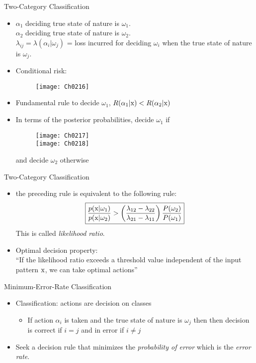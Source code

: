\begin{frame}{Two-Category Classification}
\begin{itemize}
\item $\alpha_1$ deciding true state of nature is $\omega_1$.\\
$\alpha_2$ deciding true state of nature is $\omega_2$.\\
$\lambda_{ij}=\lambda(\alpha_i|\omega_j)$ = loss incurred for deciding $\omega_i$ when the true state of nature is $\omega_j$.
\item Conditional risk:
\begin{figure}
\texttt{[image: Ch0216]}
\end{figure}
\item Fundamental rule to decide $\omega_1$, $R(\alpha_1|{\rm x})<R(\alpha_2|{\rm x})$
\item In terms of the posterior probabilities, decide $\omega_1$ if
\begin{figure}
\texttt{[image: Ch0217]}\\\texttt{[image: Ch0218]}
\end{figure}
and decide $\omega_2$ otherwise
\end{itemize}
\end{frame}

\begin{frame}{Two-Category Classification}
\begin{itemize}
\item the preceding rule is equivalent to the following rule:
\[\boxed{\frac{p({\rm x}|\omega_1)}{p({\rm x}|\omega_2)}>\left(\frac{\lambda_{12}-\lambda_{22}}{\lambda_{21}-\lambda_{11}}\right) \frac{P(\omega_2)}{P(\omega_1)}}\]
This is called \textit{\color{mycolor1}likelihood ratio}.
\item Optimal decision property:\\
``If the likelihood ratio exceeds a threshold value independent of the input pattern $\rm x$, we can take optimal actions''
\end{itemize}
\end{frame}



\begin{frame}{Minimum-Error-Rate Classification}
\begin{itemize}
\setlength{\itemsep}{12pt}
\item Classification: actions are decision on classes
\begin{itemize}
\item If action $\alpha_i$ is taken and the true state of nature is $\omega_j$ then then decision is correct if $i=j$ and in error if $i \neq j$
\end{itemize}
\item Seek a decision rule that minimizes the \textit{\color{mycolor2}probability of error} which is the \textit{\color{mycolor2}error rate}.
\end{itemize}
\end{frame}

